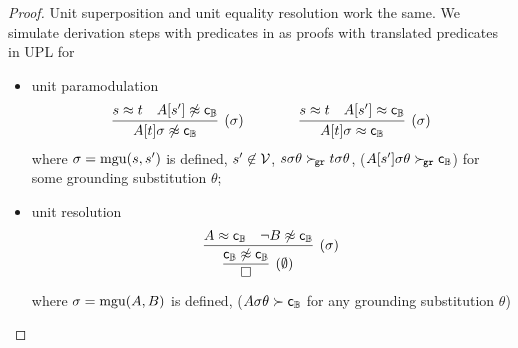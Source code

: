     \begin{proof}
        Unit superposition and unit equality resolution work the same.
        We simulate derivation steps with predicates in \InstGenEQ{}
        as proofs with translated predicates in {UPL} for
        \begin{itemize}
            \item unit paramodulation
            \begin{gather*}
                \infer
                [ (\sigma) ]
                {{A}[t]\sigma\mNE\bool{\mc}}
                {s\mEQ t&{A}[s']\mNE\bool{\mc}}
                \qquad\qquad
                \infer
                [ (\sigma)  ]
                {{A}[t]\sigma\mEQ \bool{\mc}}
                {s\mEQ t&{A}[s']\mEQ \bool{\mc}}
                \end{gather*}
            where \( \sigma=\operatorname{mgu}(s,s') \) is defined,
            \( s'\not\in\mathcal{V} \),
            \( s\sigma\theta\mathrel\succ_{\!\mathtt{gr}} t\sigma\theta \),
            {(\( {A}[s']\sigma\theta\mathrel\succ_{\!\mathtt{gr}}{\mathsf{c}}_{\mathbb{B}} \))}
            for some grounding substitution \( \theta \);

            \item %
            unit resolution
            \begin{gather*}
                \infer[(\sigma)]
                {
                    \infer[(\emptyset)]
                    {\emptyclause}
                    {\bool{\mc} \mNE \bool{\mc}}
                    }
                {A\mEQ\bool{\mc} & \lnot B\mNE\bool{\mc}}
            \end{gather*}
            where \( \sigma=\operatorname{mgu}(A,B) \) is defined,
            {
                (\( A\sigma\theta\succ{\mathsf{c}}_{\mathbb{B}} \)
                for any grounding substitution \( \theta \))
            }
        \end{itemize}
    \end{proof}

